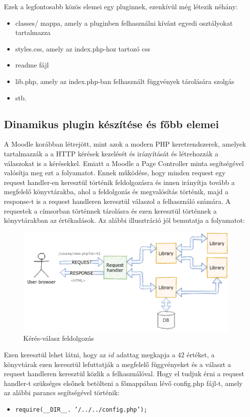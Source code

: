 Ezek a legfontosabb közös elemei egy pluginnek, ezenkívül még létezik néhány:
\begin{itemize}
    \item classes/ mappa, amely a pluginben felhasználni kívánt egyedi osztályokat tartalmazza
    \item styles.css, amely az index.php-hoz tartozó css
    \item readme fájl
    \item lib.php, amely az index.php-ban felhasznált függvények tárolására szolgás
    \item stb.
\end{itemize}

\subsection{Dinamikus plugin készítése és főbb elemei}

A Moodle korábban létrejött, mint azok a modern PHP keretrendszerek, amelyek tartalmazzák a a HTTP kérések kezelését és irányítását és létrehozzák a válaszokat is a kérésekkel. Emiatt a Moodle a Page Controller minta segítségével valósítja meg ezt a folyamatot. Ennek működése, hogy minden request egy request handler-en keresztül történik feldolgozásra és innen irányítja tovább a megfelelő könyvtárakba, ahol a feldolgozás és megvalósítás történik, majd a response-t is a request handleren keresztül válaszol a felhasználó számára. A requestek a címsorban történnek tárolásra és ezen keresztül történnek a könyvtárakban az értékadások. Az alábbi illusztráció jól bemutatja a folyamatot:
\begin{figure}
    \centering
    \includegraphics[scale=0.7]{Fejezetek/Images/requestHandler.png}
    \caption{Kérés-válasz feldolgozás}
\end{figure}
Ezen keresztül lehet látni, hogy az $id$ adattag megkapja a $42$ értéket, a könyvtárak ezen keresztül lefuttatják a megfelelő függvényeket és a választ a request handleren keresztül közlik a felhasználóval. Hogy el tudjuk érni a request handler-t szükséges elsőnek betölteni a főmappában lévő config.php fájl-t, amely az alábbi parancs segítségével történik: \par
\begin{itemize}
    \item[] \texttt{require(\_\_DIR\_\_. '/../../config.php');}
\end{itemize}

